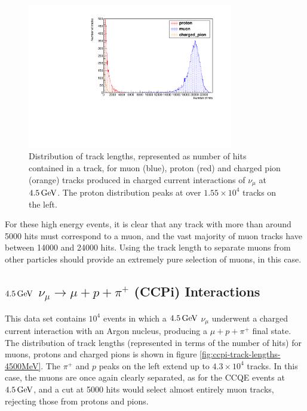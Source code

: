 \begin{figure}
\centering
\includegraphics[angle=-90,width=0.8\textwidth]{chapters/particleid_images/ccqe-4500-track-lengths}
\caption[Track length distributions for $\mu$, $p$ and $\pi^+$ from $4.5\GeV$ neutrinos (CCQE)]{\label{fig:ccqe-track-lengths-4500MeV}Distribution of track lengths, represented as number of hits contained in a track, for muon (blue), proton (red) and charged pion (orange) tracks produced in charged current interactions of $\nu_\mu$ at $4.5\GeV$. The proton distribution peaks at over $1.55\times10^4$ tracks on the left.}
\end{figure}

For these high energy events, it is clear that any track with more than around 5000 hits must correspond to a muon, and the vast majority of muon tracks have between 14000 and 24000 hits. Using the track length to separate muons from other particles should provide an extremely pure selection of muons, in this case.

\subsection{$4.5\GeV$ $\nu_\mu \rightarrow \mu + p + \pi^+$ (CCPi) Interactions}
This data set contains $10^4$ events in which a $4.5\GeV$ $\nu_\mu$ underwent a charged current interaction with an Argon nucleus, producing a $\mu + p + \pi^+$ final state. The distribution of track lengths (represented in terms of the number of hits) for muons, protons and charged pions is shown in figure \ref{fig:ccpi-track-lengths-4500MeV}. The $\pi^+$ and $p$ peaks on the left extend up to $4.3\times10^4$ tracks. In this case, the muons are once again clearly separated, as for the CCQE events at $4.5\GeV$, and a cut at 5000 hits would select almost entirely muon tracks, rejecting those from protons and pions.

